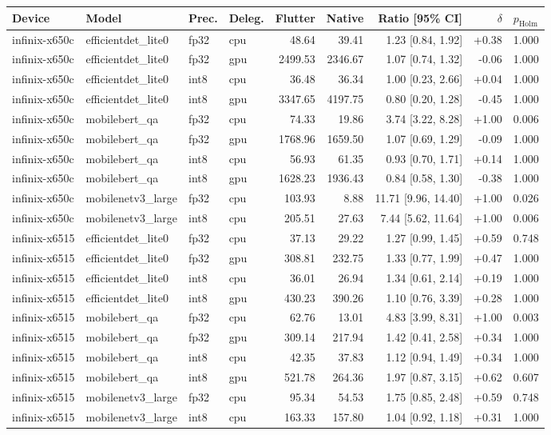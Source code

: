 \begin{tabular}{llllrrrrl}
\toprule
Device & Model & Prec. & Deleg. & Flutter & Native & Ratio [95\% CI] & $\delta$ & $p_{\mathrm{Holm}}$ \\
\midrule
infinix-x650c & efficientdet\_lite0 & fp32 & cpu & 48.64 & 39.41 & 1.23 [0.84, 1.92] & +0.38 & 1.000 \\
infinix-x650c & efficientdet\_lite0 & fp32 & gpu & 2499.53 & 2346.67 & 1.07 [0.74, 1.32] & -0.06 & 1.000 \\
infinix-x650c & efficientdet\_lite0 & int8 & cpu & 36.48 & 36.34 & 1.00 [0.23, 2.66] & +0.04 & 1.000 \\
infinix-x650c & efficientdet\_lite0 & int8 & gpu & 3347.65 & 4197.75 & 0.80 [0.20, 1.28] & -0.45 & 1.000 \\
infinix-x650c & mobilebert\_qa & fp32 & cpu & 74.33 & 19.86 & 3.74 [3.22, 8.28] & +1.00 & 0.006 \\
infinix-x650c & mobilebert\_qa & fp32 & gpu & 1768.96 & 1659.50 & 1.07 [0.69, 1.29] & -0.09 & 1.000 \\
infinix-x650c & mobilebert\_qa & int8 & cpu & 56.93 & 61.35 & 0.93 [0.70, 1.71] & +0.14 & 1.000 \\
infinix-x650c & mobilebert\_qa & int8 & gpu & 1628.23 & 1936.43 & 0.84 [0.58, 1.30] & -0.38 & 1.000 \\
infinix-x650c & mobilenetv3\_large & fp32 & cpu & 103.93 & 8.88 & 11.71 [9.96, 14.40] & +1.00 & 0.026 \\
infinix-x650c & mobilenetv3\_large & int8 & cpu & 205.51 & 27.63 & 7.44 [5.62, 11.64] & +1.00 & 0.006 \\
infinix-x6515 & efficientdet\_lite0 & fp32 & cpu & 37.13 & 29.22 & 1.27 [0.99, 1.45] & +0.59 & 0.748 \\
infinix-x6515 & efficientdet\_lite0 & fp32 & gpu & 308.81 & 232.75 & 1.33 [0.77, 1.99] & +0.47 & 1.000 \\
infinix-x6515 & efficientdet\_lite0 & int8 & cpu & 36.01 & 26.94 & 1.34 [0.61, 2.14] & +0.19 & 1.000 \\
infinix-x6515 & efficientdet\_lite0 & int8 & gpu & 430.23 & 390.26 & 1.10 [0.76, 3.39] & +0.28 & 1.000 \\
infinix-x6515 & mobilebert\_qa & fp32 & cpu & 62.76 & 13.01 & 4.83 [3.99, 8.31] & +1.00 & 0.003 \\
infinix-x6515 & mobilebert\_qa & fp32 & gpu & 309.14 & 217.94 & 1.42 [0.41, 2.58] & +0.34 & 1.000 \\
infinix-x6515 & mobilebert\_qa & int8 & cpu & 42.35 & 37.83 & 1.12 [0.94, 1.49] & +0.34 & 1.000 \\
infinix-x6515 & mobilebert\_qa & int8 & gpu & 521.78 & 264.36 & 1.97 [0.87, 3.15] & +0.62 & 0.607 \\
infinix-x6515 & mobilenetv3\_large & fp32 & cpu & 95.34 & 54.53 & 1.75 [0.85, 2.48] & +0.59 & 0.748 \\
infinix-x6515 & mobilenetv3\_large & int8 & cpu & 163.33 & 157.80 & 1.04 [0.92, 1.18] & +0.31 & 1.000 \\
\bottomrule
\end{tabular}
